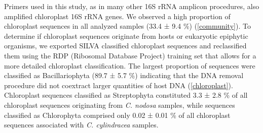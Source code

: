 \documentclass[12pt,]{article}
\begin{document}
Primers used in this study, as in many other 16S rRNA amplicon
procedures, also amplified chloroplast 16S rRNA genes. We observed a
high proportion of chloroplast sequences in all analyzed samples (33.4 ±
9.4 \si{\percent}) (\autoref{community}). To determine if chloroplast
sequences originate from hosts or eukaryotic epiphytic organisms, we
exported SILVA classified chloroplast sequences and reclassified them
using the RDP (Ribosomal Database Project) training set that allows for
a more detailed chloroplast classification. The largest proportion of
sequences were classified as Bacillariophyta (89.7 ± 5.7 \si{\percent})
indicating that the DNA removal procedure did not coextract larger
quantities of host DNA (\autoref{chloroplast}). Chloroplast sequences
classified as Streptophyta constituted 3.3 ± 2.8 \si{\percent} of all
chloroplast sequences originating from \emph{C. nodosa} samples, while
sequences classified as Chlorophyta comprised only 0.02 ± 0.01
\si{\percent} of all chloroplast sequences associated with \emph{C.
cylindracea} samples.
\end{document}
